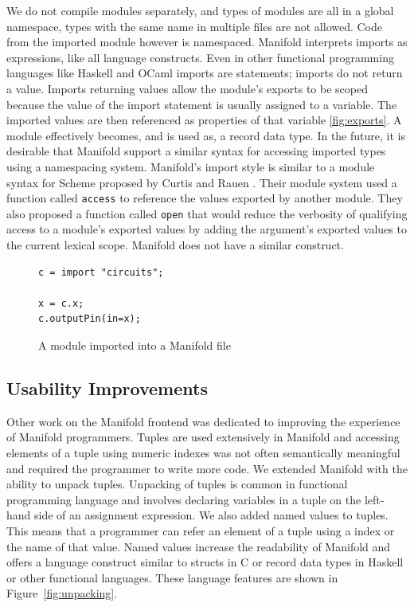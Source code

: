 We do not compile modules separately, and types of modules are all in a global namespace, types with the same name in multiple files are not allowed. Code from the imported module however is namespaced. Manifold interprets imports as expressions, like all language constructs. Even in other functional programming languages like Haskell and OCaml imports are statements; imports do not return a value.  Imports returning values allow the module's exports to be scoped because the value of the import statement is usually assigned to a variable. The imported values are then referenced as properties of that variable \ref{fig:exports}. A module effectively becomes, and is used as, a record data type. In the future, it is desirable that Manifold support a similar syntax for accessing imported types using a namespacing system. Manifold's import style is similar to a module syntax for Scheme proposed by Curtis and Rauen \cite{Curtis:1990:MSS:91556.91573}. Their module system used a function called \texttt{access} to reference the values exported by another module. They also proposed a function called \texttt{open} that would reduce the verbosity of qualifying access to a module's exported values by adding the argument's exported values to the current lexical scope. Manifold does not have a similar construct.

\begin{figure}[!ht]
\label{fig:imports}
\caption{A module imported into a Manifold file}
\begin{lstlisting}
c = import "circuits";

x = c.x;
c.outputPin(in=x);
\end{lstlisting}
\end{figure}


\subsection{Usability Improvements}

Other work on the Manifold frontend was dedicated to improving the experience
of Manifold programmers. Tuples are used extensively in Manifold and accessing
elements of a tuple using numeric indexes was not often semantically meaningful
and required the programmer to write more code. We extended Manifold with the
ability to unpack tuples. Unpacking of tuples is common in functional
programming language and involves declaring variables in a tuple on the
left-hand side of an assignment expression. We also added named values to
tuples. This means that a programmer can refer an element of a tuple using a
index or the name of that value. Named values increase the readability of
Manifold and offers a language construct similar to structs in C or record data
types in Haskell or other functional languages. These language features are
shown in Figure~\ref{fig:unpacking}.

